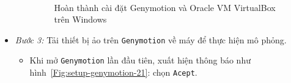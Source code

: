 \documentclass[13pt,a4paper]{extreport}
\begin{document}
\begin{itemize}
\begin{itemize}
\begin{figure}[!h]
\begin{center}
								\hspace{2cm}
								\\				
							\end{center}
							\caption{Hoàn thành cài đặt Genymotion và Oracle VM VirtualBox trên Windows}
							\label{Fig:setup-oracle-windows-complete}
						\end{figure}
				\end{itemize}
			\item \textit{Bước 3:} Tải thiết bị ảo trên \verb|Genymotion| về máy để thực hiện mô phỏng.
				\begin{itemize}
					\item Khi mở \verb|Genymotion| lần đầu tiên, xuất hiện thông báo như hình~\ref{Fig:setup-genymotion-21}: chọn \verb|Acept|.
					

\end{itemize}
\end{itemize}
\end{document}
